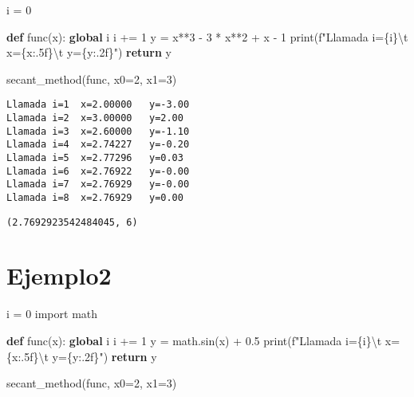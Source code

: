 \documentclass[
  letterpaper,
  DIV=11,
  numbers=noendperiod]{scrartcl}
\newenvironment{Shaded}{\begin{snugshade}}{\end{snugshade}}
\newcommand{\BuiltInTok}[1]{\textcolor[rgb]{0.00,0.23,0.31}{#1}}
\newcommand{\CharTok}[1]{\textcolor[rgb]{0.13,0.47,0.30}{#1}}
\newcommand{\ControlFlowTok}[1]{\textcolor[rgb]{0.00,0.23,0.31}{\textbf{#1}}}
\newcommand{\DecValTok}[1]{\textcolor[rgb]{0.68,0.00,0.00}{#1}}
\newcommand{\FloatTok}[1]{\textcolor[rgb]{0.68,0.00,0.00}{#1}}
\newcommand{\ImportTok}[1]{\textcolor[rgb]{0.00,0.46,0.62}{#1}}
\newcommand{\KeywordTok}[1]{\textcolor[rgb]{0.00,0.23,0.31}{\textbf{#1}}}
\newcommand{\NormalTok}[1]{\textcolor[rgb]{0.00,0.23,0.31}{#1}}
\newcommand{\OperatorTok}[1]{\textcolor[rgb]{0.37,0.37,0.37}{#1}}
\newcommand{\SpecialCharTok}[1]{\textcolor[rgb]{0.37,0.37,0.37}{#1}}
\newcommand{\SpecialStringTok}[1]{\textcolor[rgb]{0.13,0.47,0.30}{#1}}
\begin{document}
\begin{Shaded}
\begin{Highlighting}[]
\NormalTok{i }\OperatorTok{=} \DecValTok{0}

\KeywordTok{def}\NormalTok{ func(x):}
    \KeywordTok{global}\NormalTok{ i}
\NormalTok{    i }\OperatorTok{+=} \DecValTok{1}
\NormalTok{    y }\OperatorTok{=}\NormalTok{ x}\OperatorTok{**}\DecValTok{3} \OperatorTok{{-}} \DecValTok{3} \OperatorTok{*}\NormalTok{ x}\OperatorTok{**}\DecValTok{2} \OperatorTok{+}\NormalTok{ x }\OperatorTok{{-}} \DecValTok{1}
    \BuiltInTok{print}\NormalTok{(}\SpecialStringTok{f"Llamada i=}\SpecialCharTok{\{}\NormalTok{i}\SpecialCharTok{\}}\CharTok{\textbackslash{}t}\SpecialStringTok{ x=}\SpecialCharTok{\{}\NormalTok{x}\SpecialCharTok{:.5f\}}\CharTok{\textbackslash{}t}\SpecialStringTok{ y=}\SpecialCharTok{\{}\NormalTok{y}\SpecialCharTok{:.2f\}}\SpecialStringTok{"}\NormalTok{)}
    \ControlFlowTok{return}\NormalTok{ y}


\NormalTok{secant\_method(func, x0}\OperatorTok{=}\DecValTok{2}\NormalTok{, x1}\OperatorTok{=}\DecValTok{3}\NormalTok{)}
\end{Highlighting}
\end{Shaded}

\begin{verbatim}
Llamada i=1  x=2.00000   y=-3.00
Llamada i=2  x=3.00000   y=2.00
Llamada i=3  x=2.60000   y=-1.10
Llamada i=4  x=2.74227   y=-0.20
Llamada i=5  x=2.77296   y=0.03
Llamada i=6  x=2.76922   y=-0.00
Llamada i=7  x=2.76929   y=-0.00
Llamada i=8  x=2.76929   y=0.00
\end{verbatim}

\begin{verbatim}
(2.7692923542484045, 6)
\end{verbatim}

\section{Ejemplo2}\label{ejemplo2}

\begin{Shaded}
\begin{Highlighting}[]
\NormalTok{i }\OperatorTok{=} \DecValTok{0}
\ImportTok{import}\NormalTok{ math}

\KeywordTok{def}\NormalTok{ func(x):}
    \KeywordTok{global}\NormalTok{ i}
\NormalTok{    i }\OperatorTok{+=} \DecValTok{1}
\NormalTok{    y }\OperatorTok{=}\NormalTok{ math.sin(x) }\OperatorTok{+} \FloatTok{0.5}
    \BuiltInTok{print}\NormalTok{(}\SpecialStringTok{f"Llamada i=}\SpecialCharTok{\{}\NormalTok{i}\SpecialCharTok{\}}\CharTok{\textbackslash{}t}\SpecialStringTok{ x=}\SpecialCharTok{\{}\NormalTok{x}\SpecialCharTok{:.5f\}}\CharTok{\textbackslash{}t}\SpecialStringTok{ y=}\SpecialCharTok{\{}\NormalTok{y}\SpecialCharTok{:.2f\}}\SpecialStringTok{"}\NormalTok{)}
    \ControlFlowTok{return}\NormalTok{ y}


\NormalTok{secant\_method(func, x0}\OperatorTok{=}\DecValTok{2}\NormalTok{, x1}\OperatorTok{=}\DecValTok{3}\NormalTok{)}
\end{Highlighting}
\end{Shaded}
\end{document}
